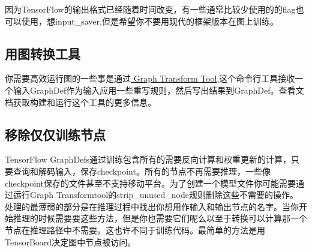 因为TensorFlow的输出格式已经随着时间改变，有一些通常比较少使用的的flag也可以使用，想input\_saver,但是希望你不要用现代的框架版本在图上训练。
\subsection{用图转换工具}
你需要高效运行图的一些事是通过\href{https://www.github.com/tensorflow/tensorflow/blob/r1.4/tensorflow/tools/graph_transforms/README.md}{ Graph Transform Tool},这个命令行工具接收一个输入GraphDef作为输入应用一些重写规则，然后写出结果到GraphDef。查看文档获取构建和运行这个工具的更多信息。
\subsection{移除仅仅训练节点}
TensorFlow GraphDefs通过训练包含所有的需要反向计算和权重更新的计算，只要查询和解码输入，保存checkpoint。所有的节点不再需要推理，一些像checkpoint保存的文件甚至不支持移动平台。为了创建一个模型文件你可能需要通过运行Graph Transformtool的strip\_unused\_node规则删除这些不需要的操作。
处理的最薄弱的部分是在推理过程中找出你想用作输入和输出节点的名字。当你开始推理的时候需要要这些方法，但是你也需要它们呢么以至于转换可以计算那一个节点在推理路径中不需要。这也许不同于训练代码。最简单的方法是用TensorBoard决定图中节点被访问。

